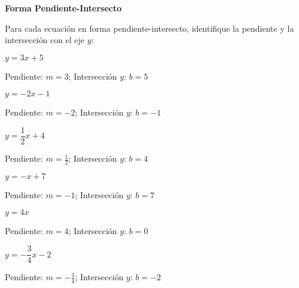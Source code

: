 \begin{exercise}
\textbf{Forma Pendiente-Intersecto}

Para cada ecuación en forma pendiente-intersecto, identifique la pendiente y la intersección con el eje $y$:

\problem $y = 3x + 5$

\begin{solucion}
Pendiente: $m = 3$; Intersección $y$: $b = 5$
\end{solucion}

\problem $y = -2x - 1$

\begin{solucion}
Pendiente: $m = -2$; Intersección $y$: $b = -1$
\end{solucion}

\problem $y = \dfrac{1}{2}x + 4$

\begin{solucion}
Pendiente: $m = \frac{1}{2}$; Intersección $y$: $b = 4$
\end{solucion}

\problem $y = -x + 7$

\begin{solucion}
Pendiente: $m = -1$; Intersección $y$: $b = 7$
\end{solucion}

\problem $y = 4x$

\begin{solucion}
Pendiente: $m = 4$; Intersección $y$: $b = 0$
\end{solucion}

\problem $y = -\dfrac{3}{4}x - 2$

\begin{solucion}
Pendiente: $m = -\frac{3}{4}$; Intersección $y$: $b = -2$
\end{solucion}
\end{exercise}

